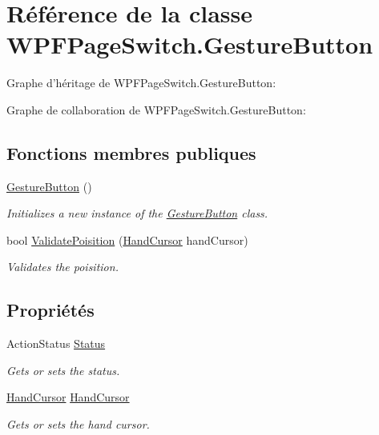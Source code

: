 \hypertarget{class_w_p_f_page_switch_1_1_gesture_button}{\section{Référence de la classe W\+P\+F\+Page\+Switch.\+Gesture\+Button}
\label{class_w_p_f_page_switch_1_1_gesture_button}
}


 




Graphe d'héritage de W\+P\+F\+Page\+Switch.\+Gesture\+Button\+:


Graphe de collaboration de W\+P\+F\+Page\+Switch.\+Gesture\+Button\+:
\subsection*{Fonctions membres publiques}
\begin{DoxyCompactItemize}
\item 
\hyperlink{class_w_p_f_page_switch_1_1_gesture_button_ac80a56a4ac464a5b5669290fcf7976ce}{Gesture\+Button} ()
\begin{DoxyCompactList}\small\item\em Initializes a new instance of the \hyperlink{class_w_p_f_page_switch_1_1_gesture_button}{Gesture\+Button} class. \end{DoxyCompactList}\item 
bool \hyperlink{class_w_p_f_page_switch_1_1_gesture_button_acd364ffb515b904e09348c146f5f9ad7}{Validate\+Poisition} (\hyperlink{class_w_p_f_page_switch_1_1_hand_cursor}{Hand\+Cursor} hand\+Cursor)
\begin{DoxyCompactList}\small\item\em Validates the poisition. \end{DoxyCompactList}\end{DoxyCompactItemize}
\subsection*{Propriétés}
\begin{DoxyCompactItemize}
\item 
Action\+Status \hyperlink{class_w_p_f_page_switch_1_1_gesture_button_a5477f8cb4541609e9f01c8578b36628e}{Status}
\begin{DoxyCompactList}\small\item\em Gets or sets the status. \end{DoxyCompactList}\item 
\hyperlink{class_w_p_f_page_switch_1_1_hand_cursor}{Hand\+Cursor} \hyperlink{class_w_p_f_page_switch_1_1_gesture_button_a644c81da321e6b399f187007bae55d3e}{Hand\+Cursor}
\begin{DoxyCompactList}\small\item\em Gets or sets the hand cursor. \end{DoxyCompactList}\end{DoxyCompactItemize}
